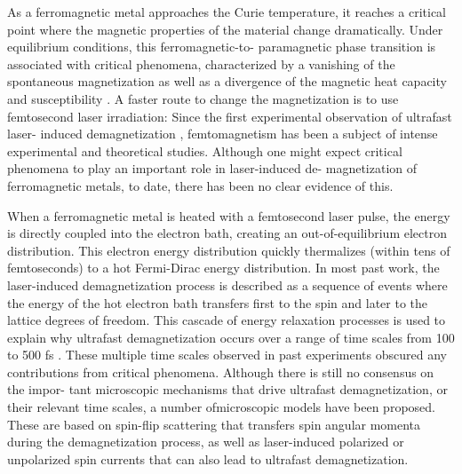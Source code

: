 As a ferromagnetic metal approaches the Curie temperature, it reaches a critical point where the magnetic properties of the material change dramatically. Under equilibrium conditions, this ferromagnetic-to- paramagnetic phase transition is associated with critical phenomena, characterized by a vanishing of the spontaneous magnetization as well as a divergence of the magnetic heat capacity and susceptibility \cite{Stohr2006}. A faster route to change the magnetization is to use femtosecond laser irradiation: Since the first experimental observation of ultrafast laser- induced demagnetization \cite{E.BeaupaireJ-CMerleA.Daunois1996}, femtomagnetism has been a subject of intense experimental and theoretical studies. Although one might expect critical phenomena to play an important role in laser-induced de- magnetization of ferromagnetic metals, to date, there has been no clear evidence of this.

When a ferromagnetic metal is heated with a femtosecond laser pulse, the energy is directly coupled into the electron bath, creating an out-of-equilibrium electron distribution. This electron energy distribution quickly thermalizes (within tens of femtoseconds) to a hot Fermi-Dirac energy distribution. In most past work, the laser-induced demagnetization process is described as a sequence of events where the energy of the hot electron bath transfers first to the spin and later to the lattice degrees of freedom. This cascade of energy relaxation processes is used to explain why ultrafast demagnetization occurs over a range of time scales from 100 to 500 fs \cite{E.BeaupaireJ-CMerleA.Daunois1996,Koopmans2010}. These multiple time scales observed in past experiments obscured any contributions from critical phenomena. Although there is still no consensus on the impor- tant microscopic mechanisms that drive ultrafast demagnetization, or their relevant time scales, a number ofmicroscopic models have been proposed. These are based on spin-flip scattering \cite{Koopmans2010, Zhang2009,Krauß2009,Bigot2009,Carpene2015,Mueller2013} that transfers spin angular momenta during the demagnetization process, as well as laser-induced polarized \cite{La-O-Vorakiat2012,Battiato2010,Rudolf2012} or unpolarized \cite{Dakovski2016,Eschenlohr2013} spin currents that can also lead to ultrafast demagnetization.

